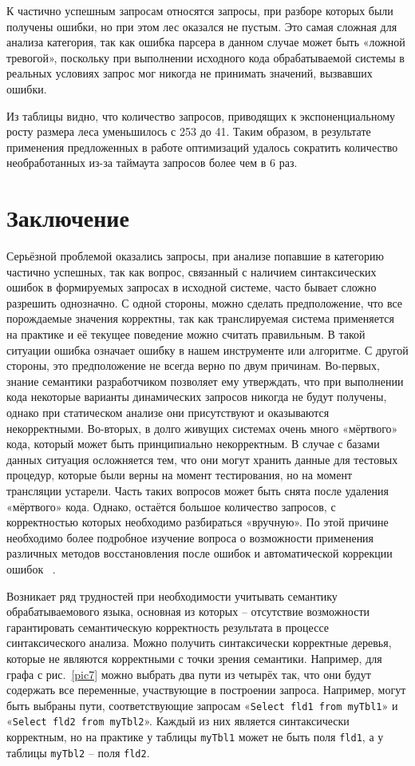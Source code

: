 \documentclass{llncs}
\begin{document}
К частично успешным запросам относятся запросы, при разборе которых были получены ошибки, но при этом лес оказался не пустым. Это самая сложная для анализа категория, так как ошибка парсера в данном случае может быть «ложной тревогой», поскольку при выполнении исходного кода обрабатываемой системы в реальных условиях запрос мог никогда не принимать значений, вызвавших ошибки.

Из таблицы видно, что количество запросов, приводящих к экспоненциальному росту размера леса уменьшилось с 253 до 41. Таким образом, в результате применения предложенных в работе оптимизаций удалось сократить количество необработанных из-за таймаута запросов более чем в 6 раз. 


\section*{Заключение}

Серьёзной проблемой оказались запросы, при анализе попавшие в категорию частично успешных, так как вопрос, связанный с наличием синтаксических ошибок в формируемых запросах в исходной системе, часто бывает сложно разрешить однозначно. С одной стороны, можно сделать предположение, что все порождаемые значения корректны, так как транслируемая система применяется на практике и её текущее поведение можно считать правильным. В такой ситуации ошибка означает ошибку в нашем инструменте или алгоритме. С другой стороны, это предположение не всегда верно по двум причинам. Во-первых, знание семантики разработчиком позволяет ему утверждать, что при выполнении кода некоторые варианты динамических запросов никогда не будут получены, однако при статическом анализе они присутствуют и оказываются некорректными. Во-вторых, в долго живущих системах очень много «мёртвого» кода, который может быть принципиально некорректным. В случае с базами данных ситуация осложняется тем, что они могут хранить данные для тестовых процедур, которые были верны на момент тестирования, но на момент трансляции устарели. Часть таких вопросов может быть снята после удаления «мёртвого» кода. Однако, остаётся большое количество запросов, с корректностью которых необходимо разбираться «вручную». По этой причине необходимо более подробное изучение вопроса о возможности применения различных методов восстановления после ошибок и автоматической коррекции ошибок ~\cite{RelaxedLALR}.

Возникает ряд трудностей при необходимости учитывать семантику обрабатываемового языка, основная из которых -- отсутствие возможности гарантировать семантическую корректность результата в процессе синтаксического анализа. Можно получить синтаксически корректные деревья, которые не являются корректными с точки зрения семантики. Например, для графа с рис.~\ref{pic7} можно выбрать два пути из четырёх так, что они будут содержать все переменные, участвующие в построении запроса. Например, могут быть выбраны пути, соответствующие запросам «\verb|Select fld1 from myTbl1|» и «\verb|Select fld2 from myTbl2|». Каждый из них является синтаксически корректным, но на практике у таблицы \verb|myTbl1|  может не быть поля \verb|fld1|, а у таблицы  \verb|myTbl2| -- поля \verb|fld2|.
\end{document}

